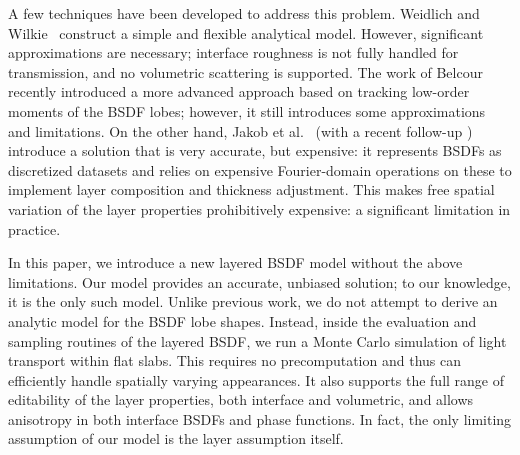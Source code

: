 %
A few techniques have been developed to address this problem. Weidlich and Wilkie~ construct a simple and flexible analytical model. However, significant approximations are necessary; interface roughness is not fully handled for transmission, and no volumetric scattering is supported. The work of Belcour~ recently introduced a more advanced approach based on tracking low-order moments of the BSDF lobes; however, it still introduces some approximations and limitations. On the other hand, Jakob et al.~ (with a recent follow-up \cite{Zeltner2018}) introduce a solution that is very accurate, but expensive: it represents BSDFs as discretized datasets and relies on expensive Fourier-domain operations on these to implement layer composition and thickness adjustment. This makes free spatial variation of the layer properties prohibitively expensive: a significant limitation in practice.


%
In this paper, we introduce a new layered BSDF model without the above limitations. Our model provides an accurate, unbiased solution; to our knowledge, it is the only such model.
Unlike previous work, we do not attempt to derive an analytic model for the BSDF lobe shapes. Instead, inside the evaluation and sampling routines of the layered BSDF, we run a Monte Carlo simulation of light transport within flat slabs.
This requires no precomputation and thus can efficiently handle spatially varying appearances. It also supports the full range of editability of the layer properties, both interface and volumetric, and allows anisotropy in both interface BSDFs and phase functions. In fact, the only limiting assumption of our model is the layer assumption itself.

